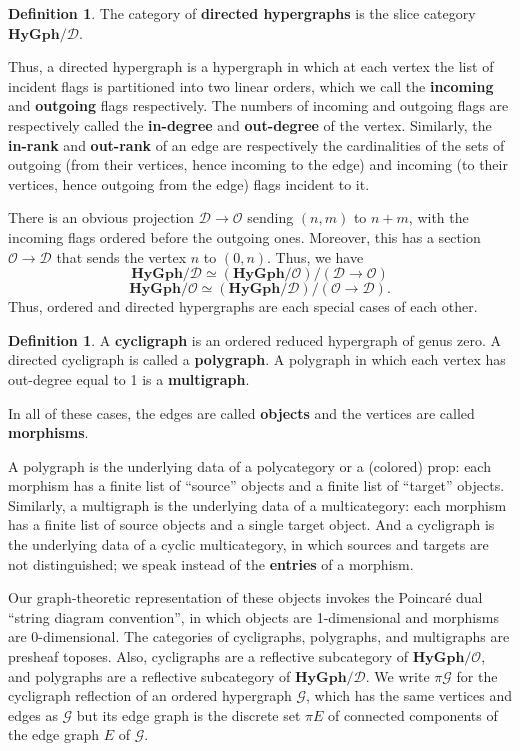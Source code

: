 \documentclass{article}
\theoremstyle{definition}
\newtheorem{defn}[thm]{Definition}
\theoremstyle{remark}
\def\G{\mathcal{G}}
\def\hy{\mathbf{HyGph}}
\def\thy{\mathcal{O}}
\def\dhy{\mathcal{D}}
\begin{document}
\begin{defn}
  The category of \textbf{directed hypergraphs} is the slice category $\hy/\dhy$.
\end{defn}

Thus, a directed hypergraph is a hypergraph in which at each vertex the list of incident flags is partitioned into two linear orders, which we call the \textbf{incoming} and \textbf{outgoing} flags respectively.
The numbers of incoming and outgoing flags are respectively called the \textbf{in-degree} and \textbf{out-degree} of the vertex.
Similarly, the \textbf{in-rank} and \textbf{out-rank} of an edge are respectively the cardinalities of the sets of outgoing (from their vertices, hence incoming to the edge) and incoming (to their vertices, hence outgoing from the edge) flags incident to it.

There is an obvious projection $\dhy\to\thy$ sending $(n,m)$ to $n+m$, with the incoming flags ordered before the outgoing ones.
Moreover, this has a section $\thy\to\dhy$ that sends the vertex $n$ to $(0,n)$.
Thus, we have
\[\hy/\dhy \simeq (\hy/\thy)/(\dhy\to\thy) \]
\[\hy/\thy \simeq (\hy/\dhy)/(\thy\to\dhy).\]
Thus, ordered and directed hypergraphs are each special cases of each other.

\begin{defn}
  A \textbf{cycligraph} is an ordered reduced hypergraph of genus zero.
  A directed cycligraph is called a \textbf{polygraph}.
  A polygraph in which each vertex has out-degree equal to 1 is a \textbf{multigraph}.

  In all of these cases, the edges are called \textbf{objects} and the vertices are called \textbf{morphisms}.
\end{defn}

A polygraph is the underlying data of a polycategory or a (colored) prop: each morphism has a finite list of ``source'' objects and a finite list of ``target'' objects.
Similarly, a multigraph is the underlying data of a multicategory: each morphism has a finite list of source objects and a single target object.
And a cycligraph is the underlying data of a cyclic multicategory, in which sources and targets are not distinguished; we speak instead of the \textbf{entries} of a morphism.

Our graph-theoretic representation of these objects invokes the Poincar\'e dual ``string diagram convention'', in which objects are 1-dimensional and morphisms are 0-dimensional.
The categories of cycligraphs, polygraphs, and multigraphs are presheaf toposes.
Also, cycligraphs are a reflective subcategory of $\hy/\thy$, and polygraphs are a reflective subcategory of $\hy/\dhy$.
We write $\pi \G$ for the cycligraph reflection of an ordered hypergraph $\G$, which has the same vertices and edges as $\G$ but its edge graph is the discrete set $\pi E$ of connected components of the edge graph $E$ of $\G$.
\end{document}
